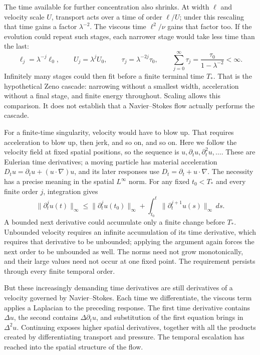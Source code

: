 The time available for further concentration also shrinks. At width
\(\ell\) and velocity scale \(U\), transport acts over a time of order
\(\ell/U\); under this rescaling that time gains a factor
\(\lambda^{-2}\). The viscous time \(\ell^2/\nu\) gains that factor too.
If the evolution could repeat such stages, each narrower stage would take
less time than the last:
\[
 \ell_j=\lambda^{-j}\ell_0,
 \qquad U_j=\lambda^jU_0,
 \qquad \tau_j=\lambda^{-2j}\tau_0,
 \qquad
 \sum_{j=0}^{\infty}\tau_j
 =\frac{\tau_0}{1-\lambda^{-2}}<\infty.
\]
Infinitely many stages could then fit before a finite terminal time \(T_*\). That
is the hypothetical Zeno cascade: narrowing without a smallest width,
acceleration without a final stage, and finite energy throughout. Scaling
allows this comparison. It does not establish that a Navier--Stokes flow
actually performs the cascade.

For a finite-time singularity, velocity would have to blow up. That requires
acceleration to blow up, then jerk, and so on, and so on. Here we follow the
velocity field at fixed spatial positions, so the sequence is
\(u,\partial_tu,\partial_t^2u,\ldots\). These are Eulerian time derivatives;
a moving particle has material acceleration
\(D_tu=\partial_tu+(u\cdot\nabla)u\), and its later responses use
\(D_t=\partial_t+u\cdot\nabla\).
The necessity has a precise meaning in the spatial \(L^\infty\) norm.
For any fixed \(t_0<T_*\) and every finite order \(j\), integration gives
\[
 \|\partial_t^ju(t)\|_\infty
 \le \|\partial_t^ju(t_0)\|_\infty
 +\int_{t_0}^{t}\|\partial_t^{j+1}u(s)\|_\infty\,ds.
\]
A bounded next derivative could accumulate only a finite change before
\(T_*\). Unbounded velocity requires an infinite accumulation of its time
derivative, which requires that derivative to be unbounded; applying the
argument again forces the next order to be unbounded as well. The norms
need not grow monotonically, and their large values need not occur at one
fixed point. The requirement persists through every finite temporal order.

But these increasingly demanding time derivatives are still derivatives of
a velocity governed by Navier--Stokes. Each time we differentiate, the
viscous term applies a Laplacian to the preceding response. The first time
derivative contains \(\Delta u\), the second contains
\(\Delta\partial_tu\), and substitution of the first equation brings in
\(\Delta^2u\). Continuing exposes higher spatial derivatives, together
with all the products created by differentiating transport and pressure.
The temporal escalation has reached into the spatial structure of the flow.

